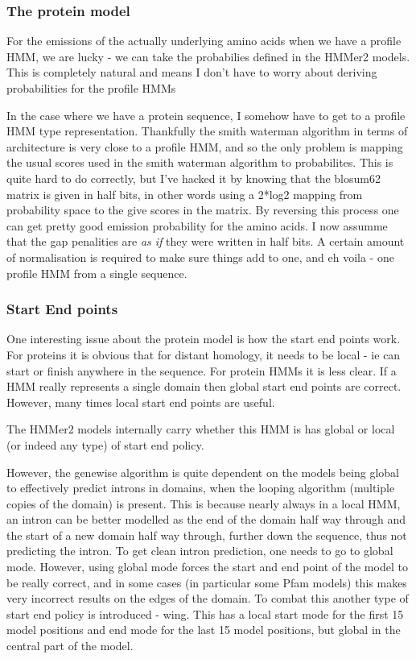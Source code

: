 \documentclass{article}
\begin{document}
\subsubsection{The protein model}

For the emissions of the actually underlying amino acids when we have
a profile HMM, we are lucky - we can take the probabilies defined in
the HMMer2 models. This is completely natural and means I don't have
to worry about deriving probabilities for the profile HMMs

In the case where we have a protein sequence, I somehow have to get to
a profile HMM type representation. Thankfully the smith waterman
algorithm in terms of architecture is very close to a profile HMM, and
so the only problem is mapping the usual scores used in the smith
waterman algorithm to probabilites. This is quite hard to do
correctly, but I've hacked it by knowing that the blosum62 matrix is
given in half bits, in other words using a 2*log2 mapping from
probability space to the give scores in the matrix.  By reversing this
process one can get pretty good emission probability for the amino
acids. I now assumme that the gap penalities are \emph{as if} they were
written in half bits. A certain amount of normalisation is required to
make sure things add to one, and eh voila - one profile HMM from a
single sequence.

\subsubsection{Start End points}
\label{sec:start_end}

One interesting issue about the protein model is how the start end points
work. For proteins it is obvious that for distant homology, it needs to
be local - ie can start or finish anywhere in the sequence. For protein HMMs
it is less clear. If a HMM really represents a single domain then global start
end points are correct. However, many times local start end points are useful.

The HMMer2 models internally carry whether this HMM is has global or local (or
indeed any type) of start end policy.

However, the genewise algorithm is quite dependent on the models being global
to effectively predict introns in domains, when the looping algorithm (multiple
copies of the domain) is present. This is because nearly always in a local
HMM, an intron can be better modelled as the end of the domain half way
through and the start of a new domain half way through, further down the sequence,
thus not predicting the intron. To get clean intron prediction, one needs to go
to global mode. However, using global mode forces the start and end point of the model
to be really correct, and in some cases (in particular some Pfam models) this makes
very incorrect results on the edges of the domain. To combat this another type
of start end policy is introduced - wing. This has a local start mode for the first
15 model positions and end mode for the last 15 model positions, but global in the
central part of the model.
\end{document}
